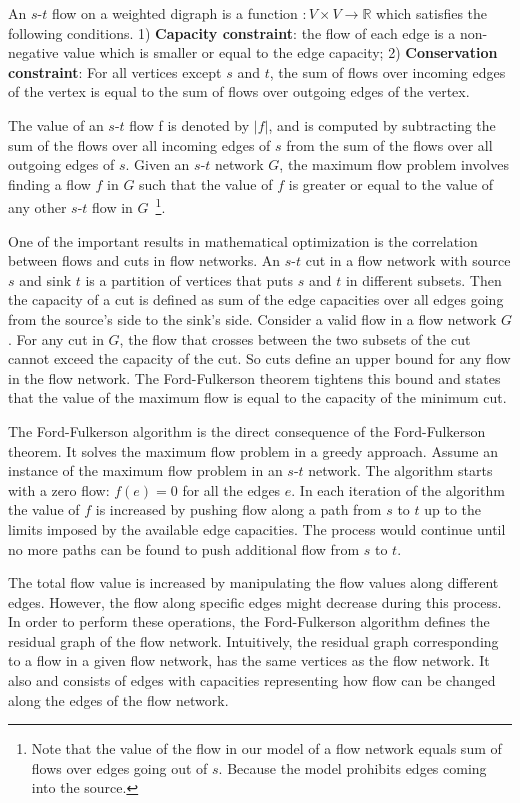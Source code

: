 \documentclass{llncs}
\begin{document}
An $s$-$t$ flow on a weighted digraph is a function $\colon V \times V \rightarrow \mathbb{R}$ which satisfies the following conditions. 1) \textbf{Capacity constraint}: the flow of each edge is a non-negative value which is smaller or equal to the edge capacity; 2) \textbf{Conservation constraint}: For all vertices except $s$ and $t$, the sum of flows over incoming edges of the vertex is equal to the sum of flows over outgoing edges of the vertex.

The value of an $s$-$t$ flow f is denoted by $|f|$, and is computed by subtracting the sum of the flows over all incoming edges of $s$ from the sum of the flows over all outgoing edges of $s$. Given an $s$-$t$ network $G$, the maximum flow problem involves finding a flow $f$ in $G$ such that the value of $f$ is greater or equal to the value of any other $s$-$t$ flow in $G$~\footnote{Note that the value of the flow in our model of a flow network equals sum of flows over edges going out of $s$. Because the model prohibits edges coming into the source.}.

One of the important results in mathematical optimization is the correlation between flows and cuts in flow networks. An $s$-$t$ cut in a flow network with source $s$ and sink $t$ is a partition of vertices that puts $s$ and $t$ in different subsets. Then the capacity of a cut is defined as sum of the edge capacities over all edges going from the source's side to the sink's side. Consider a valid flow in a flow network $G$. For any cut in $G$, the flow that crosses between the two subsets of the cut cannot exceed the capacity of the cut. So cuts define an upper bound for any flow in the flow network. The Ford-Fulkerson theorem tightens this bound and states that the value of the maximum flow is equal to the capacity of the minimum cut.

The Ford-Fulkerson algorithm is the direct consequence of the Ford-Fulkerson theorem. It solves the maximum flow problem in a greedy approach. Assume an instance of the maximum flow problem in an $s$-$t$ network. The algorithm starts with a zero flow: $f(e) = 0$ for all the edges $e$. In each iteration of the algorithm the value of $f$ is increased by pushing flow along a path from $s$ to $t$ up to the limits imposed by the available edge capacities. The process would continue until no more paths can be found to push additional flow from $s$ to $t$.

The total flow value is increased by manipulating the flow values along different edges. However, the flow along specific edges might decrease during this process. In order to perform these operations, the Ford-Fulkerson algorithm defines the residual graph of the flow network. Intuitively, the residual graph corresponding to a flow in a given flow network, has the same vertices as the flow network. It also and consists of edges with capacities representing how flow can be changed along the edges of the flow network.
\end{document}
